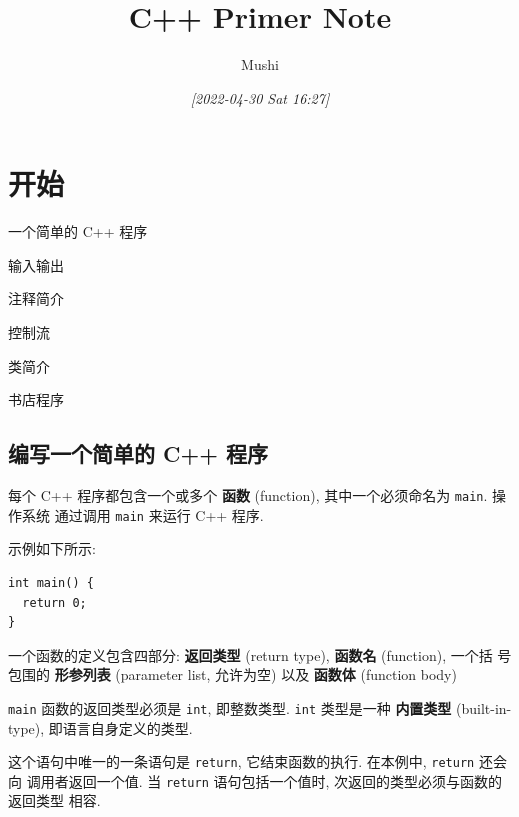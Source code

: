 \documentclass[lang=cn]{elegantbook}
\author{Mushi}
\date{\textit{[2022-04-30 Sat 16:27]}}
\title{C++ Primer Note}
\begin{document}
\maketitle
\tableofcontents



\mainmatter

\chapter{开始}
\label{sec:org336a5d8}

\begin{introduction}
  \item 一个简单的 C++ 程序
  \item 输入输出
  \item 注释简介
  \item 控制流
  \item 类简介
  \item 书店程序
\end{introduction}

\section{编写一个简单的 C++ 程序}
\label{sec:orgea8268a}

每个 C++ 程序都包含一个或多个 \textbf{函数} (function), 其中一个必须命名为 \texttt{main}. 操作系统
通过调用 \texttt{main} 来运行 C++ 程序.

\vspace*{1\baselineskip}

示例如下所示:

\begin{verbatim}
int main() {
  return 0;
}
\end{verbatim}

一个函数的定义包含四部分: \textbf{返回类型} (return type), \textbf{函数名} (function), 一个括
号包围的 \textbf{形参列表} (parameter list, 允许为空) 以及 \textbf{函数体} (function body)

\texttt{main} 函数的返回类型必须是 \texttt{int}, 即整数类型. \texttt{int} 类型是一种 \textbf{内置类型}
(built-in-type), 即语言自身定义的类型.

这个语句中唯一的一条语句是 \texttt{return}, 它结束函数的执行. 在本例中, \texttt{return} 还会向
调用者返回一个值. 当 \texttt{return} 语句包括一个值时, 次返回的类型必须与函数的返回类型
相容.

\vspace*{1\baselineskip}
\end{document}
